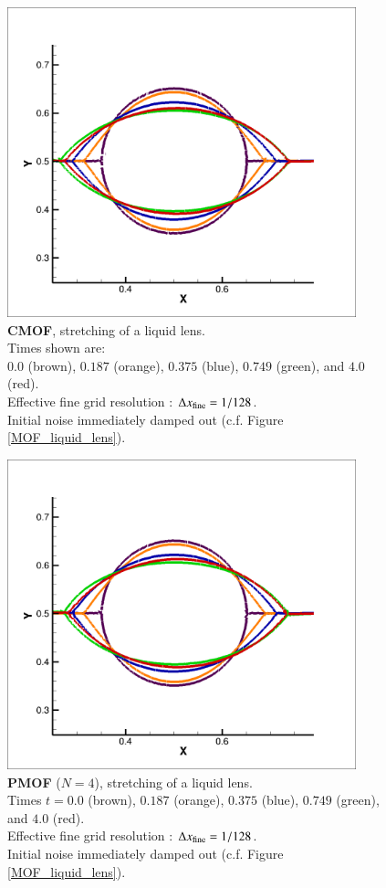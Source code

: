 \documentclass[preprint,12pt]{Definitions/elsarticle}
\newcommand{\tn}{\textnormal}
\begin{document}
\begin{figure}[H]
	\centering
	\includegraphics[width=0.9\textwidth]{CMOF_NOTRUNCATE_LENS.png} 
	\caption{\textbf{CMOF}, stretching of a liquid lens.  \\
		Times shown are:\\
		$0.0$ (brown), $0.187$ (orange), 
		$0.375$ (blue), $0.749$ (green), and $4.0$ (red).\\
		Effective fine grid resolution : $\Delta x_\tn{fine}=1/128$.\\
		Initial noise immediately damped out (c.f. Figure \ref{MOF_liquid_lens}). }
	\label{CMOF_liquid_lens}
\end{figure}

\begin{figure}[H]
	\centering
	\includegraphics[width=0.9\textwidth]{PLS_MOF_NOTRUNCATE_LENS.png} 
	\caption{\textbf{PMOF} ($N=4$), stretching of a liquid lens.  \\
		Times $t=0.0$ (brown), $0.187$ (orange), 
		$0.375$ (blue), $0.749$ (green), and $4.0$ (red).\\
		Effective fine grid resolution : $\Delta x_\tn{fine}=1/128$.\\
		Initial noise immediately damped out (c.f. Figure \ref{MOF_liquid_lens}). }
	\label{PLSMOF_liquid_lens}
\end{figure}
\end{document}
